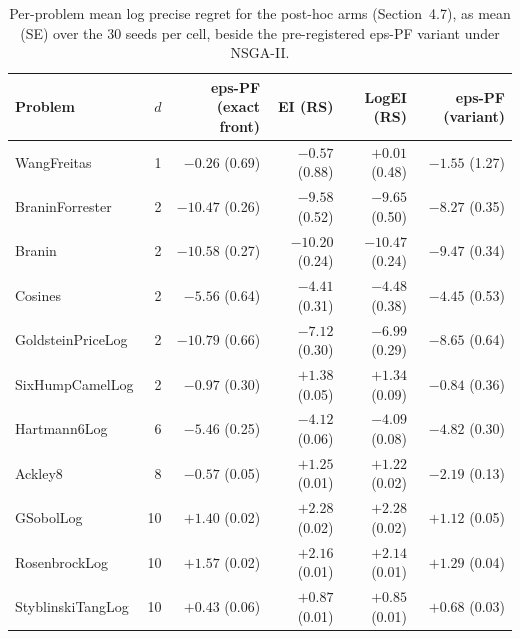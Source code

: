 \begin{table}[t]
\centering
\caption{Per-problem mean log precise regret for the post-hoc arms (Section~4.7), as mean (SE) over the 30 seeds per cell, beside the pre-registered eps-PF variant under NSGA-II.}
\label{tab:appd-exp12}
\footnotesize
\begin{tabular}{lrrrrr}
\toprule
Problem & $d$ & eps-PF (exact front) & EI (RS) & LogEI (RS) & eps-PF (variant) \\
\midrule
WangFreitas & 1 & $-0.26$ (0.69) & $-0.57$ (0.88) & $+0.01$ (0.48) & $-1.55$ (1.27) \\
BraninForrester & 2 & $-10.47$ (0.26) & $-9.58$ (0.52) & $-9.65$ (0.50) & $-8.27$ (0.35) \\
Branin & 2 & $-10.58$ (0.27) & $-10.20$ (0.24) & $-10.47$ (0.24) & $-9.47$ (0.34) \\
Cosines & 2 & $-5.56$ (0.64) & $-4.41$ (0.31) & $-4.48$ (0.38) & $-4.45$ (0.53) \\
GoldsteinPriceLog & 2 & $-10.79$ (0.66) & $-7.12$ (0.30) & $-6.99$ (0.29) & $-8.65$ (0.64) \\
SixHumpCamelLog & 2 & $-0.97$ (0.30) & $+1.38$ (0.05) & $+1.34$ (0.09) & $-0.84$ (0.36) \\
Hartmann6Log & 6 & $-5.46$ (0.25) & $-4.12$ (0.06) & $-4.09$ (0.08) & $-4.82$ (0.30) \\
Ackley8 & 8 & $-0.57$ (0.05) & $+1.25$ (0.01) & $+1.22$ (0.02) & $-2.19$ (0.13) \\
GSobolLog & 10 & $+1.40$ (0.02) & $+2.28$ (0.02) & $+2.28$ (0.02) & $+1.12$ (0.05) \\
RosenbrockLog & 10 & $+1.57$ (0.02) & $+2.16$ (0.01) & $+2.14$ (0.01) & $+1.29$ (0.04) \\
StyblinskiTangLog & 10 & $+0.43$ (0.06) & $+0.87$ (0.01) & $+0.85$ (0.01) & $+0.68$ (0.03) \\
\bottomrule
\end{tabular}
\end{table}
